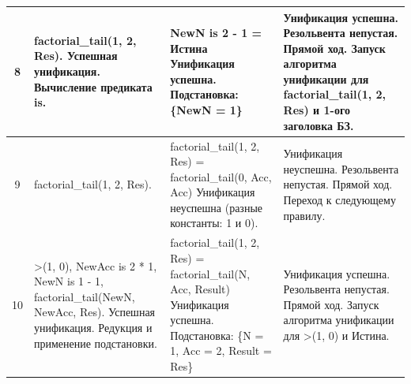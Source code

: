 \begin{tabularx}{\textwidth}{|c|>{\small}X|>{\small}X|>{\small}X|}
	8                                                                                  &
	factorial\_tail(1, 2, Res). \newline
	Успешная унификация. \newline
	Вычисление предиката is.                                                           &
	NewN is 2 - 1 = \newline
	Истина \newline
	Унификация успешна. \newline
	Подстановка: \newline
	\{NewN = 1\}                                                                       &
	Унификация успешна. \newline
	Резольвента непустая. \newline
	Прямой ход. \newline
	Запуск алгоритма унификации для factorial\_tail(1, 2, Res) и 1-ого заголовка БЗ.           \\
	\hline

	9                                                                                  &
	factorial\_tail(1, 2, Res).                                                        &
	factorial\_tail(1, 2, Res) = \newline
	factorial\_tail(0, Acc, Acc) \newline
	Унификация неуспешна (разные константы: 1 и 0).                                    &
	Унификация неуспешна. \newline
	Резольвента непустая. \newline
	Прямой ход. Переход к следующему правилу.                                                  \\
	\hline

	10                                                                                 &
	>(1, 0), \newline
	NewAcc is 2 * 1, \newline
	NewN is 1 - 1, \newline
	factorial\_tail(NewN, NewAcc, Res). \newline
	Успешная унификация. \newline
	Редукция и применение подстановки.                                                 &
	factorial\_tail(1, 2, Res) = \newline
	factorial\_tail(N, Acc, Result) \newline
	Унификация успешна. \newline
	Подстановка: \newline
	\{N = 1, Acc = 2, Result = Res\}                                                   &
	Унификация успешна. \newline
	Резольвента непустая. \newline
	Прямой ход. \newline
	Запуск алгоритма унификации для >(1, 0) и Истина.                                          \\
	\hline


\end{tabularx}
